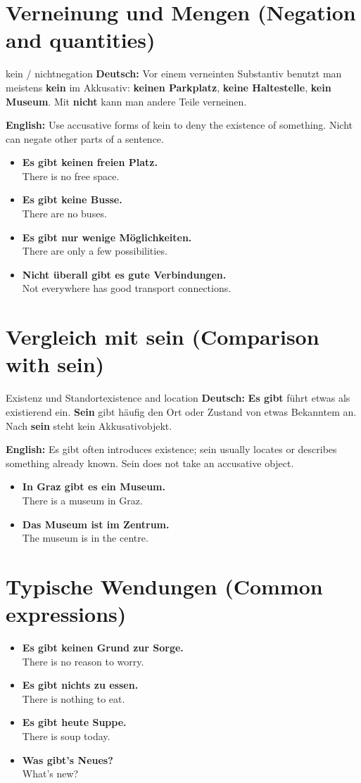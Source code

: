 \documentclass[a4paper,11pt]{article}
\newcommand{\GermanText}[1]{\textbf{Deutsch: }#1\par}
\newcommand{\EnglishText}[1]{{\small\color{SoftGray}\textbf{English: }#1\par}}
\newcommand{\ExampleItem}[2]{\item \textbf{#1}\\{\small\color{SoftGray}#2}}
\begin{document}
\section{Verneinung und Mengen (Negation and quantities)}
\begin{grammarentry}{kein / nicht}{negation}
\GermanText{Vor einem verneinten Substantiv benutzt man meistens \textbf{kein} im Akkusativ: \textbf{keinen Parkplatz}, \textbf{keine Haltestelle}, \textbf{kein Museum}. Mit \textbf{nicht} kann man andere Teile verneinen.}
\EnglishText{Use accusative forms of kein to deny the existence of something. Nicht can negate other parts of a sentence.}
\end{grammarentry}
\begin{exbox}\begin{itemize}
\ExampleItem{Es gibt keinen freien Platz.}{There is no free space.}
\ExampleItem{Es gibt keine Busse.}{There are no buses.}
\ExampleItem{Es gibt nur wenige Möglichkeiten.}{There are only a few possibilities.}
\ExampleItem{Nicht überall gibt es gute Verbindungen.}{Not everywhere has good transport connections.}
\end{itemize}\end{exbox}
\section{Vergleich mit sein (Comparison with sein)}
\begin{grammarentry}{Existenz und Standort}{existence and location}
\GermanText{\textbf{Es gibt} führt etwas als existierend ein. \textbf{Sein} gibt häufig den Ort oder Zustand von etwas Bekanntem an. Nach \textbf{sein} steht kein Akkusativobjekt.}
\EnglishText{Es gibt often introduces existence; sein usually locates or describes something already known. Sein does not take an accusative object.}
\end{grammarentry}
\begin{exbox}\begin{itemize}
\ExampleItem{In Graz gibt es ein Museum.}{There is a museum in Graz.}
\ExampleItem{Das Museum ist im Zentrum.}{The museum is in the centre.}
\end{itemize}\end{exbox}
\section{Typische Wendungen (Common expressions)}
\begin{exbox}\begin{itemize}
\ExampleItem{Es gibt keinen Grund zur Sorge.}{There is no reason to worry.}
\ExampleItem{Es gibt nichts zu essen.}{There is nothing to eat.}
\ExampleItem{Es gibt heute Suppe.}{There is soup today.}
\ExampleItem{Was gibt's Neues?}{What's new?}
\end{itemize}\end{exbox}
\end{document}
